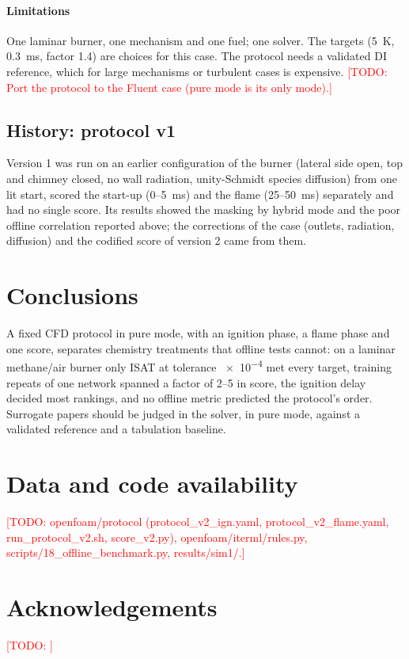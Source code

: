 \documentclass[preprint,review,12pt]{elsarticle}
\newcommand{\todo}[1]{\textcolor{red}{[TODO: #1]}}
\begin{document}
\paragraph{Limitations} One laminar burner, one mechanism and one fuel; one solver. The targets (5~K, 0.3~ms, factor
1.4) are choices for this case. The protocol needs a validated DI reference, which for large mechanisms or turbulent
cases is expensive. \todo{Port the protocol to the Fluent case (pure mode is its only mode).}

\subsection{History: protocol v1}
\label{sec:history}
Version 1 was run on an earlier configuration of the burner (lateral side open, top and chimney closed, no wall
radiation, unity-Schmidt species diffusion) from one lit start, scored the start-up (0--5~ms) and the flame
(25--50~ms) separately and had no single score. Its results showed the masking by hybrid mode and the poor offline
correlation reported above; the corrections of the case (outlets, radiation, diffusion) and the codified score of
version 2 came from them.

\section{Conclusions}
A fixed CFD protocol in pure mode, with an ignition phase, a flame phase and one score, separates chemistry treatments
that offline tests cannot: on a laminar methane/air burner only ISAT at tolerance \num{e-4} met every target, training
repeats of one network spanned a factor of 2--5 in score, the ignition delay decided most rankings, and no offline
metric predicted the protocol's order. Surrogate papers should be judged in the solver, in pure mode, against a
validated reference and a tabulation baseline.

\section*{Data and code availability}
\todo{openfoam/protocol (protocol\_v2\_ign.yaml, protocol\_v2\_flame.yaml, run\_protocol\_v2.sh, score\_v2.py),
openfoam/iterml/rules.py, scripts/18\_offline\_benchmark.py, results/sim1/.}

\section*{Acknowledgements}
\todo{}



\end{document}
